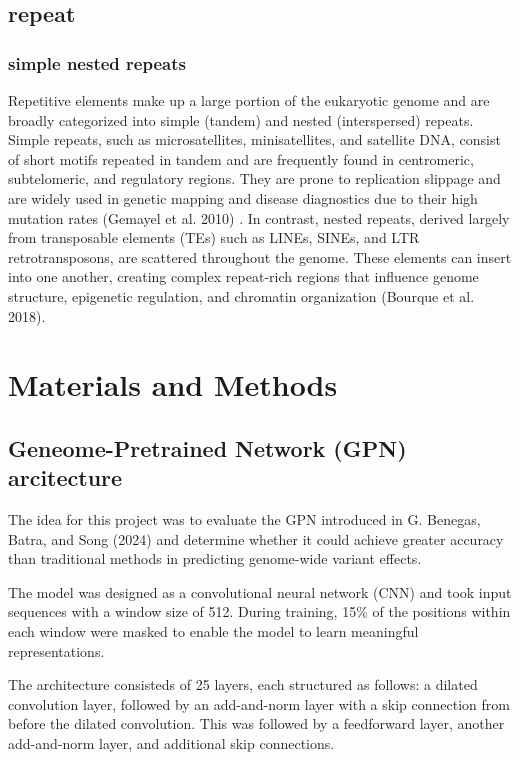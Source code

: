 \documentclass[
  a4paper,
  openany]{scrbook}
\begin{document}
\section{repeat}\label{repeat}

\subsection{simple nested repeats}\label{simple-nested-repeats}

Repetitive elements make up a large portion of the eukaryotic genome and
are broadly categorized into simple (tandem) and nested (interspersed)
repeats. Simple repeats, such as microsatellites, minisatellites, and
satellite DNA, consist of short motifs repeated in tandem and are
frequently found in centromeric, subtelomeric, and regulatory regions.
They are prone to replication slippage and are widely used in genetic
mapping and disease diagnostics due to their high mutation rates
(Gemayel et al. 2010) . In contrast, nested repeats, derived largely
from transposable elements (TEs) such as LINEs, SINEs, and LTR
retrotransposons, are scattered throughout the genome. These elements
can insert into one another, creating complex repeat-rich regions that
influence genome structure, epigenetic regulation, and chromatin
organization (Bourque et al. 2018).

\chapter{Materials and Methods}\label{materials-and-methods}

\section{Geneome-Pretrained Network (GPN)
arcitecture}\label{geneome-pretrained-network-gpn-arcitecture}

The idea for this project was to evaluate the GPN introduced in G.
Benegas, Batra, and Song (2024) and determine whether it could achieve
greater accuracy than traditional methods in predicting genome-wide
variant effects.

The model was designed as a convolutional neural network (CNN) and took
input sequences with a window size of 512. During training, 15\% of the
positions within each window were masked to enable the model to learn
meaningful representations.

The architecture consisteds of 25 layers, each structured as follows: a
dilated convolution layer, followed by an add-and-norm layer with a skip
connection from before the dilated convolution. This was followed by a
feedforward layer, another add-and-norm layer, and additional skip
connections.
\end{document}
